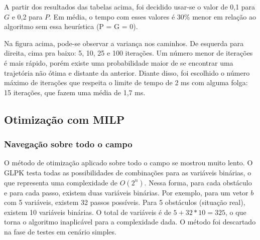 \documentclass[a4paper,12pt]{article}
\begin{document}
\begin{table}[H]
\caption{Tempos de computação com 25 iterações - média de $5000$ ensaios.}
\label{tab:Tempos_RRT_3}
\end{table}

A partir dos resultados das tabelas acima, foi decidido usar-se o valor de 0,1 para $G$ e 0,2 para $P$. Em média, o tempo com esses valores é 30\% menor em relação ao algoritmo sem essa heurística (P = G = 0).

Na figura acima, pode-se observar a variança nos caminhos. De esquerda para direita, cima pra baixo: 5, 10, 25 e 100 iterações. Um número menor de iterações é mais rápido, porém existe uma probabilidade maior de se encontrar uma trajetória não ótima e distante da anterior. Diante disso, foi escolhido o número máximo de iterações que respeita o limite de tempo de 2 ms com alguma folga: 15 iterações, que fazem uma média de 1,7 ms.

\subsection{Otimização com MILP}
\subsubsection{Navegação sobre todo o campo}

O método de otimização aplicado sobre todo o campo se mostrou muito lento. O GLPK testa todas as possibilidades de combinações para as variáveis binárias, o que representa uma complexidade de $O(2^n)$. Nessa forma, para cada obstáculo e para cada passo, existem duas variáveis binárias. Por exemplo, para um vetor $b$ com 5 variáveis, existem 32 passos possíveis. Para 5 obstáculos (situação real), existem 10 variáveis binárias. O total de variáveis é de $5 + 32*10 = 325$, o que torna o algoritmo inaplicável para a complexidade dada. O método foi descartado na fase de testes em cenário simples.
\end{document}
